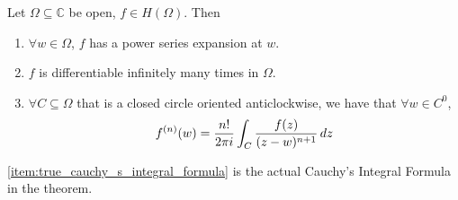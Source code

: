 \documentclass[11pt, oneside]{book}
\begin{document}
\begin{thm}\label{thm:cauchy_s_integral_formula_2}
	Let $\Omega \subseteq \mathbb{C}$ be open, $f \in H(\Omega)$. Then
	\begin{enumerate}
		\item $\forall w \in \Omega$, $f$ has a power series expansion at $w$.
		\item $f$ is differentiable infinitely many times in $\Omega$.
		\item $\forall C \subseteq \Omega$ that is a closed circle oriented anticlockwise, we have that $\forall w \in C^0$, \label{item:true_cauchy_s_integral_formula}
			\begin{equation}\label{eq:cauchy_s_integral_formula_2}
			 	f^{(n)} (w) = \frac{n!}{2 \pi i} \int_{C} \frac{f(z)}{(z - w)^{n + 1}} \mathop{}\!d{z} 
			\end{equation} 
	\end{enumerate}
\end{thm}

\begin{remark}
	\cref{item:true_cauchy_s_integral_formula} is the actual Cauchy's Integral Formula in the theorem.
\end{remark}
\end{document}
